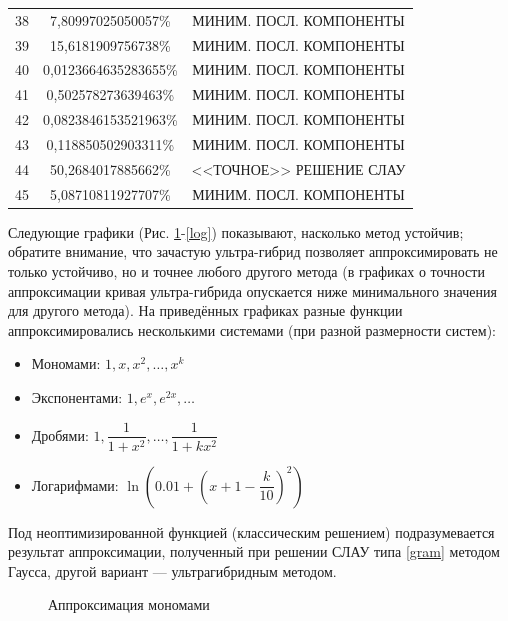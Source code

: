 \documentclass[a4paper]{article}
\begin{document}
\begin{table}[h]
\begin{center}
\begin{tabular}[t]{|c|c|c|}
38& 7,80997025050057\% &МИНИМ. ПОСЛ. КОМПОНЕНТЫ \\
39& 15,6181909756738\% &МИНИМ. ПОСЛ. КОМПОНЕНТЫ\\
40& 0,0123664635283655\% &МИНИМ. ПОСЛ. КОМПОНЕНТЫ\\
41& 0,502578273639463\% &МИНИМ. ПОСЛ. КОМПОНЕНТЫ\\
42& 0,0823846153521963\% &МИНИМ. ПОСЛ. КОМПОНЕНТЫ\\
43& 0,118850502903311\% &МИНИМ. ПОСЛ. КОМПОНЕНТЫ\\
44& 50,2684017885662\% &<<ТОЧНОЕ>> РЕШЕНИЕ СЛАУ\\
45& 5,08710811927707\% &МИНИМ. ПОСЛ. КОМПОНЕНТЫ \\
 \hline
  \end{tabular}
\end{center}
\end{table}



Следующие графики (Рис. \ref{monex}-\ref{log}) показывают, насколько метод устойчив;
обратите внимание, что зачастую ультра-гибрид позволяет аппроксимировать не только устойчиво,
но и точнее любого другого метода (в графиках о точности аппроксимации кривая ультра-гибрида опускается ниже минимального значения для другого метода).
На приведённых графиках разные функции аппроксимировались несколькими системами (при разной размерности систем):
\begin{itemize}
  \item Мономами: $1, x, x^2,\dots , x^k$
  \item Экспонентами: $1, e^x, e^{2x},\dots$
  \item Дробями: $1,\dfrac{1}{1+x^2}, \dots , \dfrac{1}{1+kx^2}$
  \item Логарифмами: $\ln\left(0.01 + \left(x+1-\dfrac{k}{10}\right)^2\right)$
\end{itemize}
Под неоптимизированной функцией (классическим решением) подразумевается результат аппроксимации, полученный при решении СЛАУ типа \ref{gram} методом Гаусса, другой вариант --- ультрагибридным методом.

\begin{figure}[h!]
  \noindent{}
 \caption{Аппроксимация мономами}
  \label{monex}
\end{figure}
\end{document}
